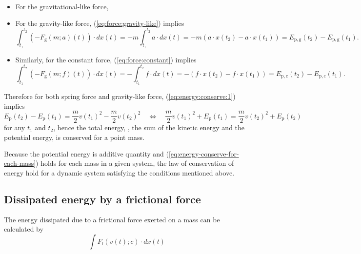 \documentclass{article}
\begin{document}
\begin{itemize}
\item For the gravitational-like force,

\item
For the gravity-like force,
(\ref{eq:force:gravity-like}) implies
\begin{equation}
\label{eq:potential-energy-gravity-like}
	\int_{t_1}^{t_2} (-F_\mathrm{g}(m;a)(t))\cdot dx(t)
=
	-m \int_{t_1}^{t_2} a\cdot dx(t)
=
	-m (a\cdot x(t_2) - a\cdot x(t_1))
=
	E_\mathrm{p,g}(t_2)
	-
	E_\mathrm{p,g}(t_1).
\end{equation}

\item
Similarly,
for the constant force,
(\ref{eq:force:constant}) implies
\begin{equation}
\label{eq:potential-energy-gravity-like}
	\int_{t_1}^{t_2} (-F_\mathrm{g}(m;f)(t))\cdot dx(t)
=
	- \int_{t_1}^{t_2} f\cdot dx(t)
=
	- (f\cdot x(t_2) - f\cdot x(t_1))
=
	E_\mathrm{p,c}(t_2)
	-
	E_\mathrm{p,c}(t_1).
\end{equation}

\end{itemize}

Therefore for both spring force and gravity-like force,
(\ref{eq:energy:conserve:1})
implies
\begin{equation}
\label{eq:energy-conserve-for-each-mass}
E_\mathrm{p}(t_2) - E_\mathrm{p}(t_1)
=
\frac{m}{2} v(t_1)^2
- \frac{m}{2}v(t_2)^2
\quad
\Leftrightarrow
\quad
\frac{m}{2} v(t_1)^2 + E_\mathrm{p}(t_1)
=
\frac{m}{2} v(t_2)^2 + E_\mathrm{p}(t_2)
\end{equation}
for any $t_1$ and $t_2$,
hence the total energy,
\ie,
the sum of the kinetic energy and the potential energy,
is conserved for a point mass.

Because the potential energy is additive quantity
and (\ref{eq:energy-conserve-for-each-mass})
holds for each mass in a given system,
the law of conservation of energy hold
for a dynamic system satisfying the conditions mentioned above.


\subsection{Dissipated energy by a frictional force}

The energy dissipated due to a frictional force exerted on a mass
can be calculated by
\begin{equation}
\int F_\mathrm{f}(v(t);c) \cdot dx(t)
\end{equation}
\end{document}
